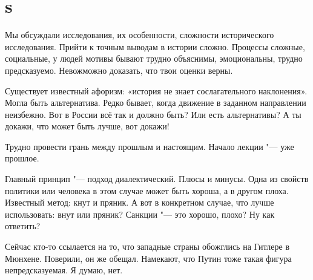 \section{s}
Мы обсуждали исследования, их особенности, сложности исторического исследования. Прийти к точным выводам в истории сложно. Процессы сложные, социальные, у людей мотивы бывают трудно объяснимы, эмоциональны, трудно предсказуемо. Невожможно доказать, что твои оценки верны.

Существует известный афоризм: «история не знает сослагательного наклонения». Могла быть альтернатива. Редко бывает, когда движение в заданном направлении неизбежно. Вот в России всё так и должно быть? Или есть альтернативы? А ты докажи, что может быть лучше, вот докажи!

Трудно провести грань между прошлым и настоящим. Начало лекции "--- уже прошлое.

Главный принцип "--- подход диалектический. Плюсы и минусы. Одна из свойств политики или человека в этом случае может быть хороша, а в другом плоха. Известный метод: кнут и пряник. А вот в конкретном случае, что лучше использовать: внут или пряник? Санкции "--- это хорошо, плохо? Ну как ответить?

Сейчас кто-то ссылается на то, что западные страны обожглись на Гитлере в Мюнхене. Поверили, он же обещал. Намекают, что Путин тоже такая фигура непредсказуемая. Я думаю, нет.

